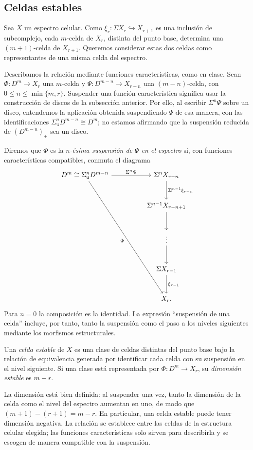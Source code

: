 \subsection{Celdas estables}

Sea $X$ un espectro celular. Como $\xi_r\colon\Sigma X_r\hookrightarrow X_{r+1}$ es una inclusión de subcomplejo, cada $m$-celda de $X_r$, distinta del punto base, determina una $(m+1)$-celda de $X_{r+1}$. Queremos considerar estas dos celdas como representantes de una misma celda del espectro.

Describamos la relación mediante funciones características, como en clase. Sean $\Phi\colon D^m\to X_r$ una $m$-celda y $\Psi\colon D^{m-n}\to X_{r-n}$ una $(m-n)$-celda, con $0\le n\le\min\{m,r\}$. Suspender una función característica significa usar la construcción de discos de la subsección anterior. Por ello, al escribir $\Sigma^n\Psi$ sobre un disco, entendemos la aplicación obtenida suspendiendo $\Psi$ de esa manera, con las identificaciones $\Sigma_{\mathrm u}^nD^{m-n}\cong D^m$; no estamos afirmando que la suspensión reducida de $(D^{m-n})_+$ sea un disco.

Diremos que $\Phi$ es la \emph{$n$-ésima suspensión de $\Psi$ en el espectro} si, con funciones características compatibles, conmuta el diagrama
\[
\begin{tikzcd}[column sep=huge,row sep=large]
D^m\cong\Sigma_{\mathrm u}^nD^{m-n}
\arrow[r,"\Sigma^n\Psi"] \arrow[ddddr,"\Phi"']
& \Sigma^nX_{r-n}
\arrow[d,"\Sigma^{n-1}\xi_{r-n}"]\\
& \Sigma^{n-1}X_{r-n+1} \arrow[d]\\
& \vdots \arrow[d]\\
& \Sigma X_{r-1} \arrow[d,"\xi_{r-1}"]\\
& X_r.
\end{tikzcd}
\]
Para $n=0$ la composición es la identidad. La expresión ``suspensión de una celda'' incluye, por tanto, tanto la suspensión como el paso a los niveles siguientes mediante los morfismos estructurales.

\begin{defi}\label{defi:c10-celda-estable}
Una \emph{celda estable} de $X$ es una clase de celdas distintas del punto base bajo la relación de equivalencia generada por identificar cada celda con su suspensión en el nivel siguiente. Si una clase está representada por $\Phi\colon D^m\to X_r$, su \emph{dimensión estable} es $m-r$.
\end{defi}

La dimensión está bien definida: al suspender una vez, tanto la dimensión de la celda como el nivel del espectro aumentan en uno, de modo que $(m+1)-(r+1)=m-r$. En particular, una celda estable puede tener dimensión negativa. La relación se establece entre las celdas de la estructura celular elegida; las funciones características solo sirven para describirla y se escogen de manera compatible con la suspensión.

